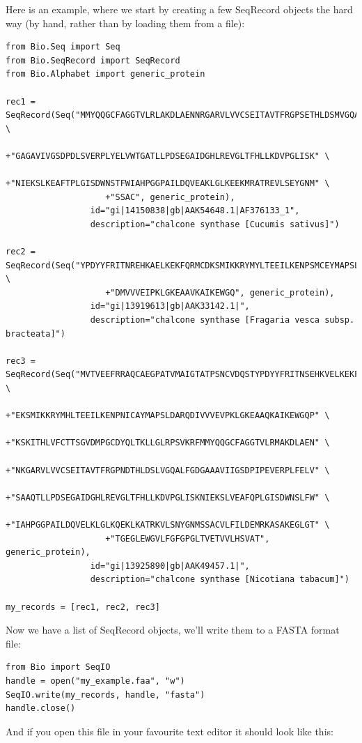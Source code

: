 \documentclass{report}
\begin{document}
Here is an example, where we start by creating a few SeqRecord objects the hard way (by hand, rather than by loading them from a file):

\begin{verbatim}
from Bio.Seq import Seq
from Bio.SeqRecord import SeqRecord
from Bio.Alphabet import generic_protein

rec1 = SeqRecord(Seq("MMYQQGCFAGGTVLRLAKDLAENNRGARVLVVCSEITAVTFRGPSETHLDSMVGQALFGD" \
                    +"GAGAVIVGSDPDLSVERPLYELVWTGATLLPDSEGAIDGHLREVGLTFHLLKDVPGLISK" \
                    +"NIEKSLKEAFTPLGISDWNSTFWIAHPGGPAILDQVEAKLGLKEEKMRATREVLSEYGNM" \
                    +"SSAC", generic_protein),
                 id="gi|14150838|gb|AAK54648.1|AF376133_1",
                 description="chalcone synthase [Cucumis sativus]")

rec2 = SeqRecord(Seq("YPDYYFRITNREHKAELKEKFQRMCDKSMIKKRYMYLTEEILKENPSMCEYMAPSLDARQ" \
                    +"DMVVVEIPKLGKEAAVKAIKEWGQ", generic_protein),
                 id="gi|13919613|gb|AAK33142.1|",
                 description="chalcone synthase [Fragaria vesca subsp. bracteata]")

rec3 = SeqRecord(Seq("MVTVEEFRRAQCAEGPATVMAIGTATPSNCVDQSTYPDYYFRITNSEHKVELKEKFKRMC" \
                    +"EKSMIKKRYMHLTEEILKENPNICAYMAPSLDARQDIVVVEVPKLGKEAAQKAIKEWGQP" \
                    +"KSKITHLVFCTTSGVDMPGCDYQLTKLLGLRPSVKRFMMYQQGCFAGGTVLRMAKDLAEN" \
                    +"NKGARVLVVCSEITAVTFRGPNDTHLDSLVGQALFGDGAAAVIIGSDPIPEVERPLFELV" \
                    +"SAAQTLLPDSEGAIDGHLREVGLTFHLLKDVPGLISKNIEKSLVEAFQPLGISDWNSLFW" \
                    +"IAHPGGPAILDQVELKLGLKQEKLKATRKVLSNYGNMSSACVLFILDEMRKASAKEGLGT" \
                    +"TGEGLEWGVLFGFGPGLTVETVVLHSVAT", generic_protein),
                 id="gi|13925890|gb|AAK49457.1|",
                 description="chalcone synthase [Nicotiana tabacum]")
                 
my_records = [rec1, rec2, rec3]
\end{verbatim}

\noindent Now we have a list of SeqRecord objects, we'll write them to a FASTA format file:

\begin{verbatim}
from Bio import SeqIO
handle = open("my_example.faa", "w")
SeqIO.write(my_records, handle, "fasta")
handle.close()
\end{verbatim}

\noindent And if you open this file in your favourite text editor it should look like this:
\end{document}
